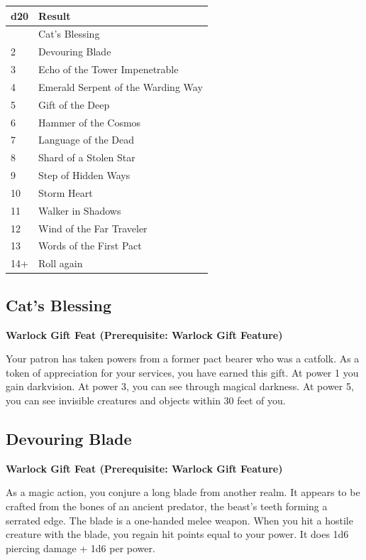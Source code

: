 \documentclass[12pt,letterpaper,twocolumn,openany,nodeprecatedcode,bg=none]{dndbook}
\begin{document}
\begin{longtable}[]{@{}ll@{}}
\toprule\noalign{}
d20 & Result \\
\midrule\noalign{}
\endhead
\bottomrule\noalign{}
\endlastfoot
1 & Cat's Blessing \\
2 & Devouring Blade \\
3 & Echo of the Tower Impenetrable \\
4 & Emerald Serpent of the Warding Way \\
5 & Gift of the Deep \\
6 & Hammer of the Cosmos \\
7 & Language of the Dead \\
8 & Shard of a Stolen Star \\
9 & Step of Hidden Ways \\
10 & Storm Heart \\
11 & Walker in Shadows \\
12 & Wind of the Far Traveler \\
13 & Words of the First Pact \\
14+ & Roll again \\
\end{longtable}

\subsection{Cat's Blessing}\label{cats-blessing}

\textbf{Warlock Gift Feat (Prerequisite: Warlock Gift Feature)}

Your patron has taken powers from a former pact bearer who was a
catfolk. As a token of appreciation for your services, you have earned
this gift. At power 1 you gain darkvision. At power 3, you can see
through magical darkness. At power 5, you can see invisible creatures
and objects within 30 feet of you.

\subsection{Devouring Blade}\label{devouring-blade}

\textbf{Warlock Gift Feat (Prerequisite: Warlock Gift Feature)}

As a magic action, you conjure a long blade from another realm. It
appears to be crafted from the bones of an ancient predator, the beast's
teeth forming a serrated edge. The blade is a one-handed melee weapon.
When you hit a hostile creature with the blade, you regain hit points
equal to your power. It does 1d6 piercing damage + 1d6 per power.
\end{document}
